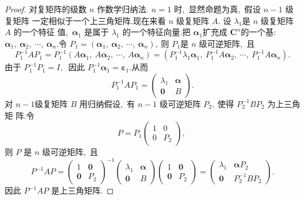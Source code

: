 \begin{proof}
	对复矩阵的级数 $ n $ 作数学归纳法. $ n=1 $ 时,\  显然命题为真,\  假设 $ n-1 $ 级复矩阵 一定相似于一个上三角矩阵.现在来看  $n $ 级复矩阵 $ A .$ 设  $\lambda_{1}  $是 $ n$  级复矩阵  $A $ 的一个特征 值,\   $\boldsymbol{\alpha}_{1}$  是属于 $ \lambda_{1} $ 的一个特征向量.把 $ \boldsymbol{\alpha}_{1}  $扩充成  $\mathbf{C}^{n}  $的一个基: $ \boldsymbol{\alpha}_{1},\  \boldsymbol{\alpha}_{2},\  \cdots,\  \boldsymbol{\alpha}_{n} .$令 $ P_{1}=   \left(\boldsymbol{\alpha}_{1},\  \boldsymbol{\alpha}_{2},\  \cdots,\  \boldsymbol{\alpha}_{n}\right) ,\  $则 $ P_{1}  $是  $n$  级可逆矩阵,\  且
	$$P_{1}^{-1} A P_{1}=P_{1}^{-1}\left(A \boldsymbol{\alpha}_{1},\  A \boldsymbol{\alpha}_{2},\  \cdots,\  A \boldsymbol{\alpha}_{n}\right)=\left(P_{1}^{-1} \lambda_{1} \boldsymbol{\alpha}_{1},\  P_{1}^{-1} A \boldsymbol{\alpha}_{2},\  \cdots,\  P_{1}^{-1} A \boldsymbol{\alpha}_{n}\right) .$$
	由于  $P_{1}^{-1} P_{1}=I ,\ $ 因此 $ P_{1}^{-1} \boldsymbol{\alpha}_{1}=\boldsymbol{\varepsilon}_{1}  .$从而
	$$P_{1}^{-1} A P_{1}=\left(\begin{array}{cc}
		\lambda_{1} & \boldsymbol{\alpha} \\
		\boldsymbol{0} & B
	\end{array}\right) .$$
	对 $ n-1  $级复矩阵  $B $ 用归纳假设,\  有  $n-1 $ 级可逆矩阵  $P_{2} ,\  $使得  $P_{2}^{-1} B P_{2} $ 为上三角矩 阵.令
	$$P=P_{1}\left(\begin{array}{ll}
		1 & 0 \\
		0 & P_{2}
	\end{array}\right),\ $$
	则  $P$  是  $n $ 级可逆矩阵,\  且
	$$P^{-1} A P=\left(\begin{array}{ll}
		1 & \mathbf{0} \\
		\mathbf{0} & P_{2}
	\end{array}\right)^{-1}\left(\begin{array}{cc}
		\lambda_{1} & \boldsymbol{\alpha} \\
		\mathbf{0} & B
	\end{array}\right)\left(\begin{array}{cc}
		1 & \mathbf{0} \\
		\mathbf{0} & P_{2}
	\end{array}\right)=\left(\begin{array}{cc}
		\lambda_{1} & \boldsymbol{\alpha} P_{2} \\
		\mathbf{0} & P_{2}^{-1} B P_{2}
	\end{array}\right) .$$
	因此 $ P^{-1} A P $ 是上三角矩阵.
\end{proof}
